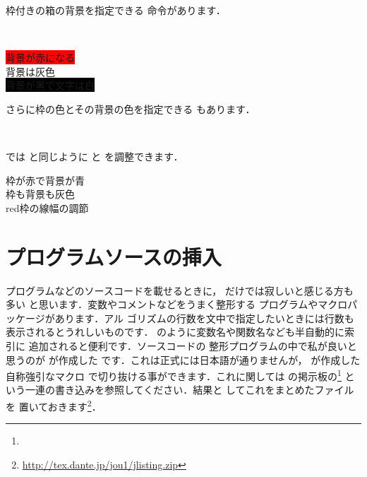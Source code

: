 枠付きの箱の背景を指定できる 命令があります．
\begin{Syntax}
\\
\end{Syntax}
\begin{InOut}
\colorbox{red}{背景が赤になる}\\
\colorbox[gray]{.8}{背景は灰色}\\
\colorbox{black}{\color{white}%
  背景が黒で文字は白}
\end{InOut}
%
さらに枠の色とその背景の色を指定できる 
もあります．
\begin{Syntax}
\\
%
\end{Syntax}
では と同じように 
と を調整できます．
\begin{InOut}
  {枠が赤で背景が青}\\
  {枠も背景も灰色}\\
{\fboxrule=2.4pt
  {red}{枠の線幅の調節}}
\end{InOut}



\section{プログラムソースの挿入\zdash{}}
プログラムなどのソースコードを載せるときに，
だけでは寂しいと感じる方も多い
と思います．変数やコメントなどをうまく整形する
プログラムやマクロパッケージがあります．アル
ゴリズムの行数を文中で指定したいときには行数も
表示されるとうれしいものです．
のように変数名や関数名なども半自動的に索引に
追加されると便利です．ソースコードの
整形プログラムの中で私が良いと思うのが
が作成した
です．これは正式には日本語が通りませんが，
が作成した自称強引なマクロ
で切り抜ける事ができます．これに関しては
の掲示板の\footnote{\webListings}
という一連の書き込みを参照してください．結果と
してこれをまとめたファイルを%
置いておきます\footnote{\url{http://tex.dante.jp/jou1/jlisting.zip}}．


